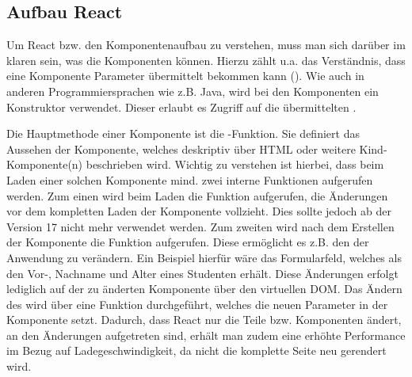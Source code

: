 
\subsection{Aufbau React}
\label{ssec:AufbauReact}

Um React bzw. den Komponentenaufbau zu verstehen, muss man sich darüber im klaren sein, was die Komponenten können. 
Hierzu zählt u.a. das Verständnis, dass eine Komponente Parameter übermittelt bekommen kann (\props). 
Wie auch in anderen Programmiersprachen wie z.B. Java, wird bei den Komponenten ein Konstruktor  verwendet.
Dieser erlaubt es Zugriff auf die übermittelten \props. 

Die Hauptmethode einer Komponente ist die \render-Funktion. 
Sie definiert das Aussehen der Komponente, welches deskriptiv über \acs{HTML} oder weitere Kind-Kompo\-nente(n) beschrieben wird. 
Wichtig zu verstehen ist hierbei, dass beim Laden einer solchen Komponente mind. zwei interne Funktionen aufgerufen werden. 
Zum einen wird beim Laden die Funktion \cwm aufgerufen, die Änderungen vor dem kompletten Laden der Komponente vollzieht.
Dies sollte jedoch ab der Version 17 nicht mehr verwendet werden. 
Zum zweiten wird nach dem Erstellen der Komponente die Funktion \cdm aufgerufen. 
Diese ermöglicht es z.B. den \state  der Anwendung zu verändern. 
Ein Beispiel hierfür wäre das Formularfeld, welches als \props den Vor-, Nachname und Alter eines Studenten erhält. 
Diese Änderungen erfolgt lediglich auf der zu änderten Komponente über den virtuellen \acs{DOM}. 
Das Ändern des \state wird über eine Funktion \exampleState durchgeführt, welches die neuen Parameter in der Komponente setzt.
Dadurch, dass React nur die Teile bzw. Komponenten ändert, an den Änderungen aufgetreten sind, erhält man zudem eine erhöhte Performance im Bezug auf Ladegeschwindigkeit, da nicht die komplette Seite neu gerendert wird. 

